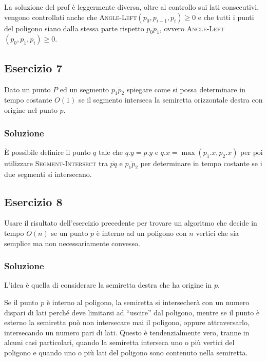 La soluzione del prof è leggermente diversa, oltre al controllo sui lati consecutivi, vengono controllati anche che \textsc{Angle-Left}$(p_0, p_{i-1}, p_i) \geq 0$ e che tutti i punti del poligono siano dalla stessa parte rispetto $\overline{p_0p_1}$, ovvero \textsc{Angle-Left}$(p_0, p_{1}, p_i) \geq 0$.

\subsection{Esercizio 7}\label{esercizio-7}

Dato un punto $P$ ed un segmento $\overline{p_1p_2}$ spiegare come si possa determinare in tempo costante $O(1)$ se il segmento interseca la semiretta orizzontale destra con origine nel punto $p$.

\subsubsection{Soluzione}

\`{E} possibile definire il punto $q$ tale che $q.y = p.y$ e $q.x = \max (p_1.x, p_2.x)$ per poi utilizzare \textsc{Segment-Intersect} tra $\overline{pq}$ e $\overline{p_1p_2}$ per determinare in tempo costante se i due segmenti si intersecano.

\subsection{Esercizio 8}\label{esercizio-8}

Usare il risultato dell'esercizio precedente per trovare un algoritmo che decide in tempo $O(n)$ se un punto $p$ è interno ad un poligono con $n$ vertici che sia semplice ma non necessariamente convesso.

\subsubsection{Soluzione}

L'idea è quella di considerare la semiretta destra che ha origine in $p$.

Se il punto $p$ è interno al poligono, la semiretta si intersecherà con un numero dispari di lati perché deve limitarsi ad ``uscire'' dal poligono, mentre se il punto è esterno la semiretta può non intersecare mai il poligono, oppure attraversarlo, intersecando un numero pari di lati. Questo è tendenzialmente vero, tranne in alcuni casi particolari, quando la semiretta interseca uno o più vertici del poligono e quando uno o più lati del poligono sono contenuto nella semiretta.

